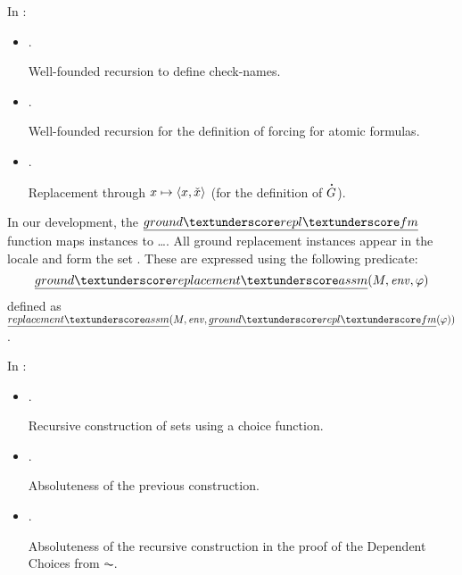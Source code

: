In :

\begin{itemize}
\item {}.
  
  Well-founded recursion to define check-names.
\item {}.

  Well-founded recursion for the definition of forcing for atomic formulas.
\item
  .

  Replacement through $x\mapsto \langle x,\check{x}\rangle$ (for the
  definition of $\punto{G}$).
\end{itemize}

In our development, the $\isa{ground{\uscore}repl{\uscore}fm}$
function maps instances to \dots. All ground replacement instances
appear in the locale  and form the set
. These are expressed using the following
predicate:
\[
  \isa{ground{\uscore}replacement{\uscore}assm}(M,\mathit{env},\phi)
\]
defined as
$\isa{replacement{\uscore}assm}(M,\mathit{env},\isa{ground{\uscore}repl{\uscore}fm}(\phi))$.

In 
:
\begin{itemize}
\item
  .

  Recursive construction of sets using a choice function.
\item
  .
  
  Absoluteness of the previous construction.
\end{itemize}
%
\begin{itemize}
\item
  .
  
  Absoluteness of the recursive construction in the proof of the
  Dependent Choices from $\AC$.
\end{itemize}

